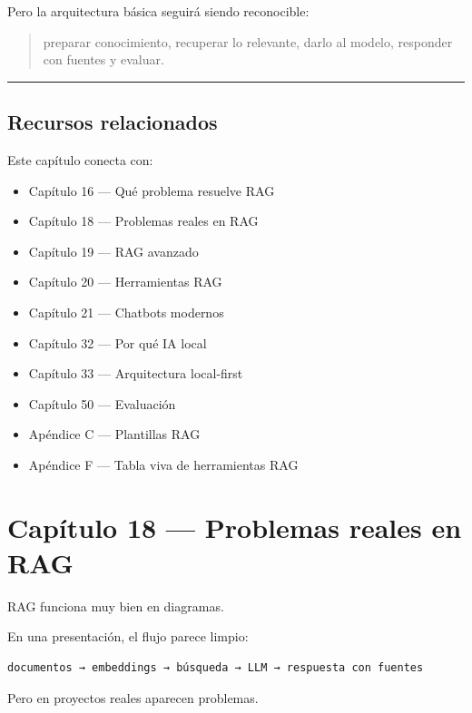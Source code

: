 Pero la arquitectura básica seguirá siendo reconocible:

\begin{quote}
preparar conocimiento, recuperar lo relevante, darlo al modelo,
responder con fuentes y evaluar.
\end{quote}

\begin{center}\rule{0.5\linewidth}{0.5pt}\end{center}

\section{Recursos relacionados}\label{recursos-relacionados-16}

Este capítulo conecta con:

\begin{itemize}
\tightlist
\item
  Capítulo 16 --- Qué problema resuelve RAG
\item
  Capítulo 18 --- Problemas reales en RAG
\item
  Capítulo 19 --- RAG avanzado
\item
  Capítulo 20 --- Herramientas RAG
\item
  Capítulo 21 --- Chatbots modernos
\item
  Capítulo 32 --- Por qué IA local
\item
  Capítulo 33 --- Arquitectura local-first
\item
  Capítulo 50 --- Evaluación
\item
  Apéndice C --- Plantillas RAG
\item
  Apéndice F --- Tabla viva de herramientas RAG
\end{itemize}

\newpage

\chapter{Capítulo 18 --- Problemas reales en
RAG}\label{capuxedtulo-18-problemas-reales-en-rag}

RAG funciona muy bien en diagramas.

En una presentación, el flujo parece limpio:

\begin{lstlisting}
documentos → embeddings → búsqueda → LLM → respuesta con fuentes
\end{lstlisting}

Pero en proyectos reales aparecen problemas.

